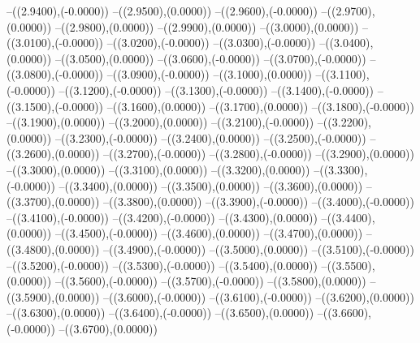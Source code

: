 {	--({\sx*(2.9400)},{\sy*(-0.0000)})
	--({\sx*(2.9500)},{\sy*(0.0000)})
	--({\sx*(2.9600)},{\sy*(-0.0000)})
	--({\sx*(2.9700)},{\sy*(0.0000)})
	--({\sx*(2.9800)},{\sy*(0.0000)})
	--({\sx*(2.9900)},{\sy*(0.0000)})
	--({\sx*(3.0000)},{\sy*(0.0000)})
	--({\sx*(3.0100)},{\sy*(-0.0000)})
	--({\sx*(3.0200)},{\sy*(-0.0000)})
	--({\sx*(3.0300)},{\sy*(-0.0000)})
	--({\sx*(3.0400)},{\sy*(0.0000)})
	--({\sx*(3.0500)},{\sy*(0.0000)})
	--({\sx*(3.0600)},{\sy*(-0.0000)})
	--({\sx*(3.0700)},{\sy*(-0.0000)})
	--({\sx*(3.0800)},{\sy*(-0.0000)})
	--({\sx*(3.0900)},{\sy*(-0.0000)})
	--({\sx*(3.1000)},{\sy*(0.0000)})
	--({\sx*(3.1100)},{\sy*(-0.0000)})
	--({\sx*(3.1200)},{\sy*(-0.0000)})
	--({\sx*(3.1300)},{\sy*(-0.0000)})
	--({\sx*(3.1400)},{\sy*(-0.0000)})
	--({\sx*(3.1500)},{\sy*(-0.0000)})
	--({\sx*(3.1600)},{\sy*(0.0000)})
	--({\sx*(3.1700)},{\sy*(0.0000)})
	--({\sx*(3.1800)},{\sy*(-0.0000)})
	--({\sx*(3.1900)},{\sy*(0.0000)})
	--({\sx*(3.2000)},{\sy*(0.0000)})
	--({\sx*(3.2100)},{\sy*(-0.0000)})
	--({\sx*(3.2200)},{\sy*(0.0000)})
	--({\sx*(3.2300)},{\sy*(-0.0000)})
	--({\sx*(3.2400)},{\sy*(0.0000)})
	--({\sx*(3.2500)},{\sy*(-0.0000)})
	--({\sx*(3.2600)},{\sy*(0.0000)})
	--({\sx*(3.2700)},{\sy*(-0.0000)})
	--({\sx*(3.2800)},{\sy*(-0.0000)})
	--({\sx*(3.2900)},{\sy*(0.0000)})
	--({\sx*(3.3000)},{\sy*(0.0000)})
	--({\sx*(3.3100)},{\sy*(0.0000)})
	--({\sx*(3.3200)},{\sy*(0.0000)})
	--({\sx*(3.3300)},{\sy*(-0.0000)})
	--({\sx*(3.3400)},{\sy*(0.0000)})
	--({\sx*(3.3500)},{\sy*(0.0000)})
	--({\sx*(3.3600)},{\sy*(0.0000)})
	--({\sx*(3.3700)},{\sy*(0.0000)})
	--({\sx*(3.3800)},{\sy*(0.0000)})
	--({\sx*(3.3900)},{\sy*(-0.0000)})
	--({\sx*(3.4000)},{\sy*(-0.0000)})
	--({\sx*(3.4100)},{\sy*(-0.0000)})
	--({\sx*(3.4200)},{\sy*(-0.0000)})
	--({\sx*(3.4300)},{\sy*(0.0000)})
	--({\sx*(3.4400)},{\sy*(0.0000)})
	--({\sx*(3.4500)},{\sy*(-0.0000)})
	--({\sx*(3.4600)},{\sy*(0.0000)})
	--({\sx*(3.4700)},{\sy*(0.0000)})
	--({\sx*(3.4800)},{\sy*(0.0000)})
	--({\sx*(3.4900)},{\sy*(-0.0000)})
	--({\sx*(3.5000)},{\sy*(0.0000)})
	--({\sx*(3.5100)},{\sy*(-0.0000)})
	--({\sx*(3.5200)},{\sy*(-0.0000)})
	--({\sx*(3.5300)},{\sy*(-0.0000)})
	--({\sx*(3.5400)},{\sy*(0.0000)})
	--({\sx*(3.5500)},{\sy*(0.0000)})
	--({\sx*(3.5600)},{\sy*(-0.0000)})
	--({\sx*(3.5700)},{\sy*(-0.0000)})
	--({\sx*(3.5800)},{\sy*(0.0000)})
	--({\sx*(3.5900)},{\sy*(0.0000)})
	--({\sx*(3.6000)},{\sy*(-0.0000)})
	--({\sx*(3.6100)},{\sy*(-0.0000)})
	--({\sx*(3.6200)},{\sy*(0.0000)})
	--({\sx*(3.6300)},{\sy*(0.0000)})
	--({\sx*(3.6400)},{\sy*(-0.0000)})
	--({\sx*(3.6500)},{\sy*(0.0000)})
	--({\sx*(3.6600)},{\sy*(-0.0000)})
	--({\sx*(3.6700)},{\sy*(0.0000)})
}
